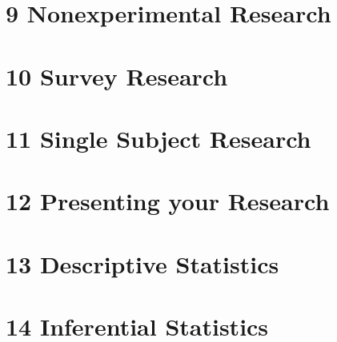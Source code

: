 \documentclass[oneside]{tufte-book}
\begin{document}
\chapter{9 Nonexperimental Research}


\chapter{10 Survey Research}


\chapter{11 Single Subject Research}


\chapter{12 Presenting your Research}


\chapter{13 Descriptive Statistics}


\chapter{14 Inferential Statistics}





\printindex
\end{document}
